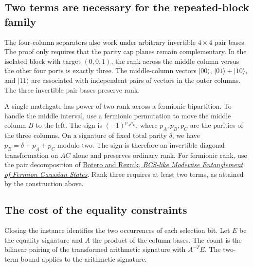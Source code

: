 \documentclass[11pt,a4paper]{article}
\numberwithin{equation}{section}
\begin{document}
\subsection{Two terms are necessary for the repeated-block family}\label{two-terms-are-necessary-for-the-repeated-block-family}

The four-column separators also work under arbitrary invertible \(4\times4\) pair bases. The proof only requires that the parity cap planes remain complementary. In the isolated block with target \((0,0,1)\), the rank across the middle column versus the other four ports is exactly three. The middle-column vectors \(|00\rangle\), \(|01\rangle+|10\rangle\), and \(|11\rangle\) are associated with independent pairs of vectors in the outer columns. The three invertible pair bases preserve rank.

A single matchgate has power-of-two rank across a fermionic bipartition. To handle the middle interval, use a fermionic permutation to move the middle column \(B\) to the left. The sign is \((-1)^{p_Ap_B}\), where \(p_A,p_B,p_C\) are the parities of the three columns. On a signature of fixed total parity \(\delta\), we have \(p_B=\delta+p_A+p_C\) modulo two. The sign is therefore an invertible diagonal transformation on \(AC\) alone and preserves ordinary rank. For fermionic rank, use the pair decomposition of \href{https://arxiv.org/abs/quant-ph/0404176}{Botero and Reznik, \emph{BCS-like Modewise Entanglement of Fermion Gaussian States}}. Rank three requires at least two terms, as attained by the construction above.

\subsection{The cost of the equality constraints}\label{the-cost-of-the-equality-constraints}

Closing the instance identifies the two occurrences of each selection bit. Let \(E\) be the equality signature and \(A\) the product of the column bases. The count is the bilinear pairing of the transformed arithmetic signature with \(A^{-T}E\). The two-term bound applies to the arithmetic signature.
\end{document}
